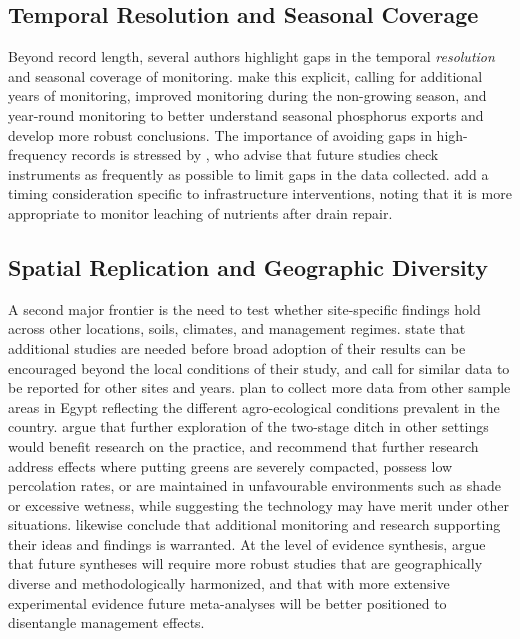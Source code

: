 \subsection{Temporal Resolution and Seasonal Coverage}

Beyond record length, several authors highlight gaps in the temporal \emph{resolution} and seasonal coverage of monitoring. \textcite{Klaiber2020} make this explicit, calling for additional years of monitoring, improved monitoring during the non-growing season, and year-round monitoring to better understand seasonal phosphorus exports and develop more robust conclusions. The importance of avoiding gaps in high-frequency records is stressed by \textcite{Hodaj2017}, who advise that future studies check instruments as frequently as possible to limit gaps in the data collected. \textcite{Wesström2015} add a timing consideration specific to infrastructure interventions, noting that it is more appropriate to monitor leaching of nutrients after drain repair.

\subsection{Spatial Replication and Geographic Diversity}

A second major frontier is the need to test whether site-specific findings hold across other locations, soils, climates, and management regimes. \textcite{Menegaz2025} state that additional studies are needed before broad adoption of their results can be encouraged beyond the local conditions of their study, and \textcite{Zimmerman2017b} call for similar data to be reported for other sites and years. \textcite{Ali2001} plan to collect more data from other sample areas in Egypt reflecting the different agro-ecological conditions prevalent in the country. \textcite{Hodaj2017} argue that further exploration of the two-stage ditch in other settings would benefit research on the practice, and \textcite{Bigelow2001} recommend that further research address effects where putting greens are severely compacted, possess low percolation rates, or are maintained in unfavourable environments such as shade or excessive wetness, while suggesting the technology may have merit under other situations. \textcite{Terrado2015} likewise conclude that additional monitoring and research supporting their ideas and findings is warranted. At the level of evidence synthesis, \textcite{Wu2025} argue that future syntheses will require more robust studies that are geographically diverse and methodologically harmonized, and that with more extensive experimental evidence future meta-analyses will be better positioned to disentangle management effects.

